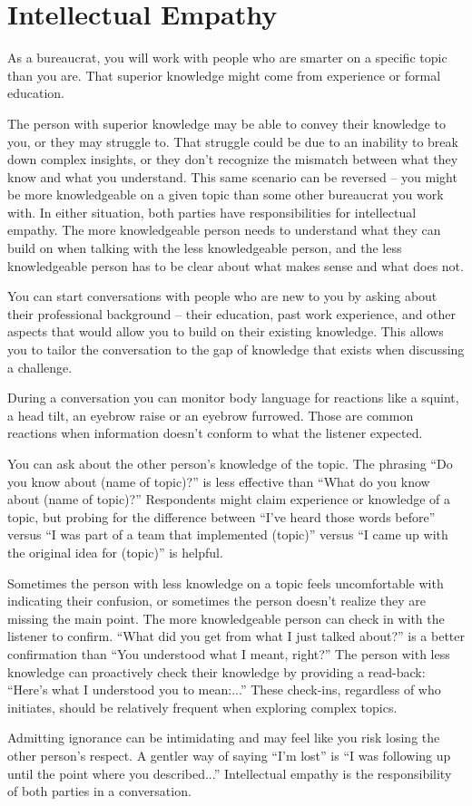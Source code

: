 \section{Intellectual Empathy\label{sec:intellectual-empathy}}

As a bureaucrat, you will work with people who are smarter on a specific topic than you are. That superior knowledge might come from experience or formal education. 

The person with superior knowledge may be able to convey their knowledge to you, or they may struggle to. That struggle could be due to an inability to break down complex insights, or they don't recognize the mismatch between what they know and what you understand. 
This same scenario can be reversed -- you might be more knowledgeable on a given topic than some other bureaucrat you work with. In either situation, both parties have responsibilities for \gls{intellectual empathy}. The more knowledgeable person needs to understand what they can build on when talking with the less knowledgeable person, and the less knowledgeable person has to be clear about what makes sense and what does not. 

You can start conversations with people who are new to you by asking about their professional background -- their education, past work experience, and other aspects that would allow you to build on their existing knowledge. 
This allows you to tailor the conversation to the gap of knowledge that exists when discussing a challenge. 

During a conversation you can monitor body language for reactions like a squint, a head tilt, an eyebrow raise or an eyebrow furrowed. 
Those are common reactions when information doesn't conform to what the listener expected. 

You can ask about the other person's knowledge of the topic. The phrasing ``Do you know about (name of topic)?'' is less effective than ``What do you know about (name of topic)?'' 
Respondents might claim experience or knowledge of a topic, but probing for the difference between ``I've heard those words before'' versus ``I was part of a team that implemented (topic)'' versus ``I came up with the original idea for (topic)'' is helpful. 

Sometimes the person with less knowledge on a topic feels uncomfortable with indicating their confusion, or sometimes the person doesn't realize they are missing the main point. The more knowledgeable person can check in with the listener to confirm. ``What did you get from what I just talked about?'' is a better confirmation than ``You understood what I meant, right?'' The person with less knowledge can proactively check their knowledge by providing a read-back: ``Here's what I understood you to mean:...'' These check-ins, regardless of who initiates, should be relatively frequent when exploring complex topics. 

Admitting ignorance can be intimidating and may feel like you risk losing the other person's respect. A gentler way of saying ``I'm lost'' is ``I was following up until the point where you described...'' Intellectual empathy is the responsibility of both parties in a conversation. 

